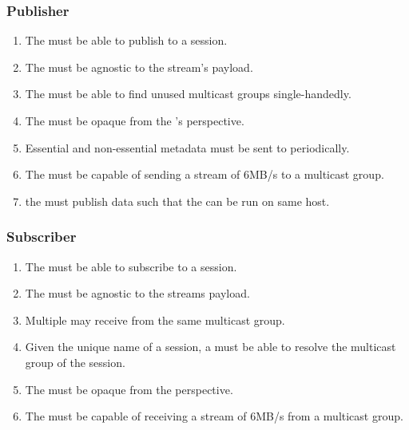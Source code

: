 \subsubsection*{Publisher}
\begin{enumerate}[ref=R-A-PUB-\arabic* on P.\thepage]
	\item The \pubs{} must be able to publish to a session. \label{req:a:pub:publishtopic}
	\item The \pub{} must be agnostic to the stream's payload.\label{req:a:pub:agnosticpayload}
	\item The  must be able to find unused multicast groups single-handedly. \label{req:a:pub:unushedsession}
	\item The \pub{} must be opaque from the \pro's perspective. \label{req:a:pub:transparent}
	\item Essential and non-essential metadata must be sent to  periodically. \label{req:a:pub:metaperiodic}
	\item The \pub{} must be capable of sending a stream of 6MB/s to a multicast group. \label{req:a:pub:6mb}
	\item the \pub{} must publish data such that the \sub{} can be run on same host. \label{req:a:pub:localmcast}
\end{enumerate}

\subsubsection*{Subscriber}
\begin{enumerate}[ref=R-A-SUB-\arabic* on P.\thepage]
	\item The \subs{} must be able to subscribe to a session.\label{req:a:s:subtopic}
	\item The \sub{} must be agnostic to the streams payload.\label{req:a:s:agnosticpayload}
	\item Multiple \subs{} may receive from the same multicast group.\label{req:a:s:multireceiv}
	\item Given the unique name of a session, a  must be able to resolve the multicast group of the session.\label{req:a:s:resolvemg}
	\item The \sub{} must be opaque from the  perspective.\label{req:a:s:transparent}
	\item The \sub{} must be capable of receiving a stream of 6MB/s from a multicast group.\label{req:a:s:recv6mb}
\end{enumerate}

